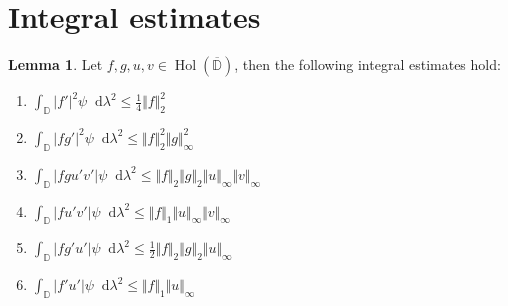 \documentclass[letterpaper, 11pt]{article}
\newcommand{\D}{\mathbb{D}}
\newcommand{\1}{\mathds{1}}
\newcommand{\dd}{\mathop{}\!\mathrm{d}}
\newcommand{\cl}[1]{\overline{#1}}
\DeclareMathOperator*{\Hol}{Hol}
\theoremstyle{definition}
\newtheorem{lemma}[theorem]{Lemma}
\begin{document}
\section{Integral estimates}

\begin{lemma}
  Let $f, g, u, v \in \Hol(\cl{\D})$, then the following integral estimates hold:
  \begin{enumerate}
    \item $ \displaystyle \int_\D \vert f' \vert^2 \psi \dd \lambda^2 \leq \frac{1}{4} \Vert f \Vert_2^2 $
    \item $ \displaystyle \int_\D \vert f g' \vert^2 \psi \dd \lambda^2 \leq \Vert f \Vert_2^2 \Vert g \Vert_\infty^2 $
    \item $ \displaystyle \int_\D \vert f g u' v' \vert \psi \dd \lambda^2 \leq \Vert f \Vert_2 \Vert g \Vert_2 \Vert u \Vert_\infty \Vert v \Vert_\infty $
    \item $ \displaystyle \int_\D \vert f u' v' \vert \psi \dd \lambda^2 \leq \Vert f \Vert_1 \Vert u \Vert_\infty \Vert v \Vert_\infty $
    \item $ \displaystyle \int_\D \vert f g' u' \vert \psi \dd \lambda^2 \leq \frac{1}{2} \Vert f \Vert_2 \Vert g \Vert_2 \Vert u \Vert_\infty $
    \item $ \displaystyle \int_\D \vert f' u' \vert \psi \dd \lambda^2 \leq \Vert f \Vert_1 \Vert u \Vert_\infty $
  \end{enumerate}
\end{lemma}
\end{document}
